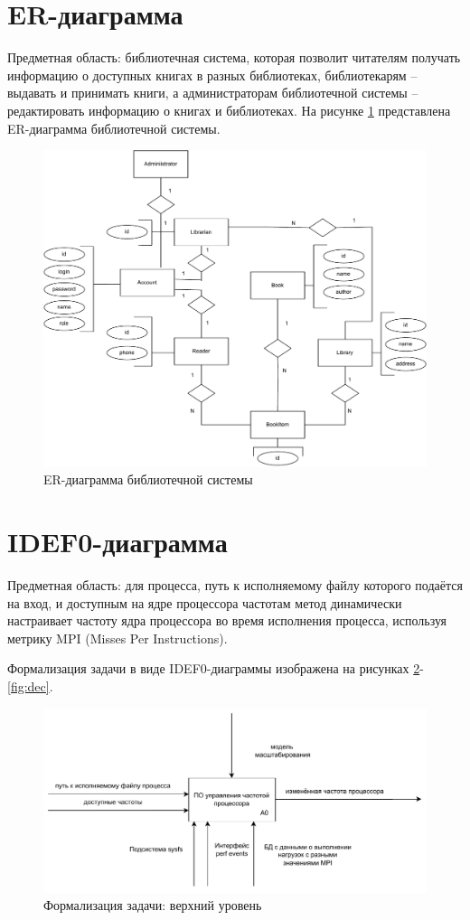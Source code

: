 \documentclass[12pt]{report}
\begin{document}
\section{ER-диаграмма}
Предметная область: библиотечная система, которая позволит читателям получать информацию о доступных книгах в разных библиотеках, библиотекарям -- выдавать и принимать книги, а администраторам библиотечной системы -- редактировать информацию о книгах и библиотеках. 
На рисунке \ref{fig:er} представлена ER-диаграмма библиотечной системы. 
\begin{figure}[h]
  \centering
  \includegraphics[scale = 0.6]{er.pdf}
  \caption{ER-диаграмма библиотечной системы}
  \label{fig:er}
\end{figure}

\section{IDEF0-диаграмма}
Предметная область: для процесса, путь к исполняемому файлу которого подаётся на вход, и доступным на ядре процессора частотам метод динамически настраивает частоту ядра процессора во время исполнения процесса, используя метрику MPI (Misses Per Instructions).

Формализация задачи в виде IDEF0-диаграммы изображена на рисунках \ref{fig:idef0-0}-\ref{fig:dec}.

\begin{figure}[h]
  \centering
  \includegraphics[scale = 0.8]{idef0-0.pdf}
  \caption{Формализация задачи: верхний уровень}
  \label{fig:idef0-0}
\end{figure}
\end{document}
